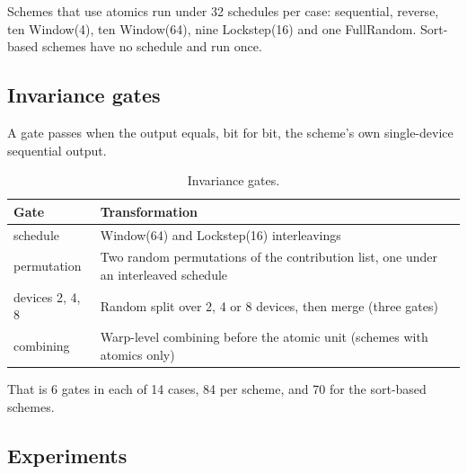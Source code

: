 \documentclass[journal]{IEEEtran}
\begin{document}
Schemes that use atomics run under 32 schedules per case: sequential,
reverse, ten Window(4), ten Window(64), nine Lockstep(16) and one
FullRandom. Sort-based schemes have no schedule and run once.

\hypertarget{invariance-gates}{%
\subsection{Invariance gates}\label{invariance-gates}}

A gate passes when the output equals, bit for bit, the scheme's own
single-device sequential output.

\begin{table}[!htbp]\centering\small\setlength{\tabcolsep}{4pt}
\caption{Invariance gates.}\label{tab:10}
\begin{tabularx}{\linewidth}{>{\raggedright\arraybackslash\hsize=0.566\hsize}X>{\raggedright\arraybackslash\hsize=1.434\hsize}X}
\toprule
Gate & Transformation \\
\midrule
schedule & Window(64) and Lockstep(16) interleavings \\
permutation & Two random permutations of the contribution list, one under an
interleaved schedule \\
devices 2, 4, 8 & Random split over 2, 4 or 8 devices, then merge (three gates) \\
combining & Warp-level combining before the atomic unit (schemes with atomics only) \\
\bottomrule
\end{tabularx}
\end{table}

That is 6 gates in each of 14 cases, 84 per scheme, and 70 for the
sort-based schemes.

\hypertarget{experiments}{%
\subsection{Experiments}\label{experiments}}
\end{document}
